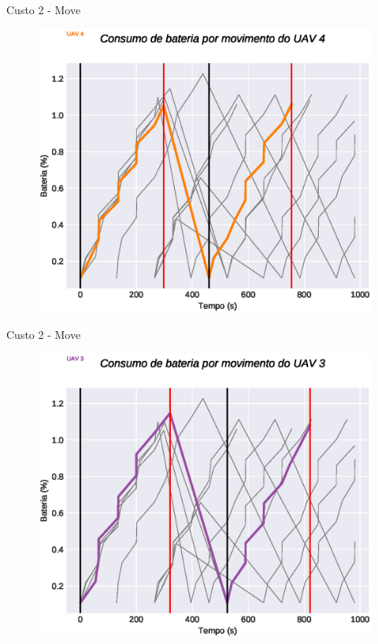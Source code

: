 \begin{frame}{Custo 2 - Move}
                \begin{figure}[!htb]
                     \includegraphics[width=\textwidth]{custo_2/uav_move_acum_uav_4.eps}
                 \end{figure}
            \end{frame}\begin{frame}{Custo 2 - Move}
                \begin{figure}[!htb]
                     \includegraphics[width=\textwidth]{custo_2/uav_move_acum_uav_3.eps}

\end{figure}
\end{frame}
